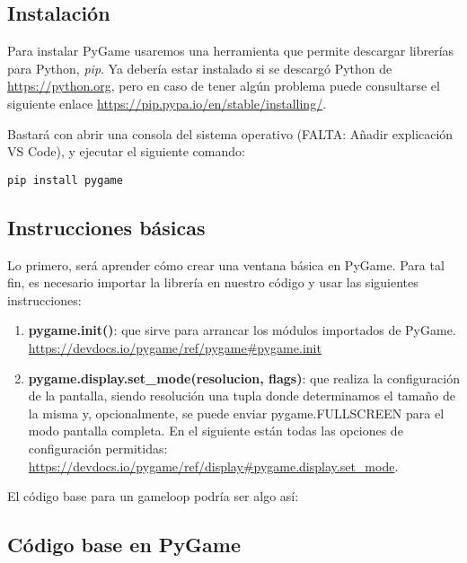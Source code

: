 \subsection{Instalación}

Para instalar PyGame usaremos una herramienta que permite descargar librerías para Python, \emph{pip}. Ya debería estar instalado si se descargó Python de \url{https://python.org}, pero en caso de tener algún problema puede consultarse el siguiente enlace \url{https://pip.pypa.io/en/stable/installing/}.

Bastará con abrir una consola del sistema operativo (FALTA: Añadir explicación VS Code), y ejecutar el siguiente comando:

\begin{lstlisting}
pip install pygame
\end{lstlisting}

\subsection{Instrucciones básicas}

Lo primero, será aprender cómo crear una ventana básica en PyGame. Para tal fin, es necesario importar la librería en nuestro código y usar las siguientes instrucciones:

\begin{enumerate}
\item \textbf{pygame.init()}: que sirve para arrancar los módulos importados de PyGame. \url{https://devdocs.io/pygame/ref/pygame#pygame.init}

\item \textbf{pygame.display.set\_mode(resolucion, flags)}: que realiza la configuración de la pantalla, siendo resolución una tupla donde determinamos el tamaño de la misma y, opcionalmente, se puede enviar pygame.FULLSCREEN para el modo pantalla completa. En el siguiente están todas las opciones de configuración permitidas: \url{https://devdocs.io/pygame/ref/display#pygame.display.set_mode}.
\end{enumerate}

El código base para un gameloop podría ser algo así:




\subsection{Código base en PyGame}


